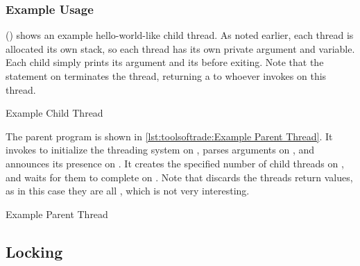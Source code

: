 \subsubsection{Example Usage}

 ()
shows an example hello-world-like child thread.
As noted earlier, each thread is allocated its own stack, so
each thread has its own private  argument and  variable.
Each child simply prints its argument and its 
before exiting.
Note that the  statement on
 terminates the thread,
returning a  to whoever invokes  on this
thread.

\begin{listing}

\caption{Example Child Thread}
\label{lst:toolsoftrade:Example Child Thread}
\end{listing}

\begin{fcvref}
The parent program is shown in
\cref{lst:toolsoftrade:Example Parent Thread}.
It invokes  to initialize the threading system on
,
parses arguments on ,
and announces its presence on .
It creates the specified number of child threads on
,
and waits for them to complete on .
Note that  discards the threads return values,
as in this case they are all , which is not very interesting.
\end{fcvref}

\begin{listing}

\caption{Example Parent Thread}
\label{lst:toolsoftrade:Example Parent Thread}
\end{listing}

\QuickQuizEnd

\subsection{Locking}
\label{sec:toolsoftrade:Locking}

